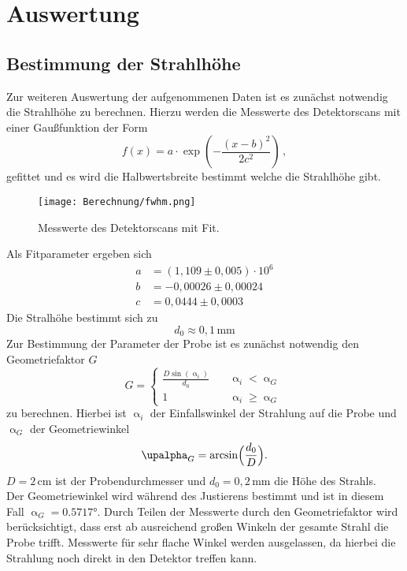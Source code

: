 \section{Auswertung}
\subsection{Bestimmung der Strahlhöhe}
Zur weiteren Auswertung der aufgenommenen Daten ist es zunächst notwendig die Strahlhöhe zu berechnen. Hierzu werden die Messwerte des Detektorscans mit einer Gaußfunktion der Form
\begin{equation}
  f(x)=a\cdot \exp\left(-\frac{(x-b)^2}{2c^2}\right)\,,
\end{equation}
gefittet und es wird die Halbwertsbreite bestimmt welche die Strahlhöhe gibt.
\begin{figure}[h]
  \centering
  \texttt{[image: Berechnung/fwhm.png]}
  \caption{Messwerte des Detektorscans mit Fit.}
\end{figure}
Als Fitparameter ergeben sich
\begin{align}
a&=(1{,}109\pm0{,}005)\cdot10^6\nonumber\\
b&=-0{,}00026\pm0{,}00024\nonumber\\
c&=0{,}0444\pm0{,}0003
\end{align}
Die Stralhöhe bestimmt sich zu
\begin{equation}
d_0\approx0{,}1\,\si{\mm}\nonumber
\end{equation}
Zur Bestimmung der Parameter der Probe ist es zunächst notwendig den Geometriefaktor $G$
\begin{equation}
  G =
     \begin{cases}
       \frac{D\sin\left(\upalpha_i\right)}{d_0} &\quad\upalpha_i<\upalpha_G\\
       1 &\quad\upalpha_i\geq\upalpha_G
     \end{cases}
\end{equation}
zu berechnen. Hierbei ist $\upalpha_i$ der Einfallswinkel der Strahlung auf die Probe und $\upalpha_G$ der Geometriewinkel
\begin{equation}
\upalpha_G=\arcsin\Bigl(\frac{d_0}{D}\Bigr).
\end{equation}
$D=2\,\si{\cm}$ ist der Probendurchmesser und $d_0=0{,}2\,\si{\mm}$ die Höhe des Strahls.\\
 Der Geometriewinkel wird während des Justierens bestimmt und ist in diesem Fall $\upalpha_G=0.5717°$.
Durch Teilen der Messwerte durch den Geometriefaktor wird berücksichtigt, dass erst ab ausreichend großen Winkeln der gesamte Strahl die Probe trifft. Messwerte für sehr flache Winkel werden ausgelassen, da hierbei die Strahlung noch direkt in den Detektor treffen kann.\\
